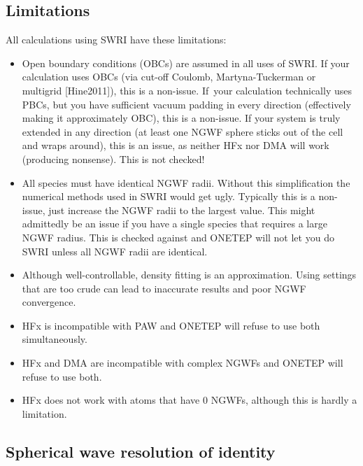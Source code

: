 \documentclass[letterpaper,10pt,english]{sphinxmanual}
\begin{document}
\subsection{Limitations}
\label{\detokenize{hfx:limitations}}
All calculations using SWRI have these limitations:
\begin{itemize}
\item {} 
Open boundary conditions (OBCs) are assumed in all uses of SWRI. If
your calculation uses OBCs (via cut-off Coulomb, Martyna-Tuckerman or
multigrid {[}Hine2011{]}), this is a non-issue. If your
calculation technically uses PBCs, but you have sufficient vacuum
padding in every direction (effectively making it approximately OBC),
this is a non-issue. If your system is truly extended in any
direction (at least one NGWF sphere sticks out of the cell and wraps
around), this is an issue, as neither HFx nor DMA will work
(producing nonsense). This is not checked!

\item {} 
All species must have identical NGWF radii. Without this
simplification the numerical methods used in SWRI would get ugly.
Typically this is a non-issue, just increase the NGWF radii to the
largest value. This might admittedly be an issue if you have a single
species that requires a large NGWF radius. This is checked against
and ONETEP will not let you do SWRI unless all NGWF radii are
identical.

\item {} 
Although well-controllable, density fitting is an approximation.
Using settings that are too crude can lead to inaccurate results and
poor NGWF convergence.

\item {} 
HFx is incompatible with PAW and ONETEP will refuse to use both
simultaneously.

\item {} 
HFx and DMA are incompatible with complex NGWFs and ONETEP will
refuse to use both.

\item {} 
HFx does not work with atoms that have 0 NGWFs, although this is
hardly a limitation.

\end{itemize}


\subsection{Spherical wave resolution of identity}
\label{\detokenize{hfx:spherical-wave-resolution-of-identity}}
\end{document}

